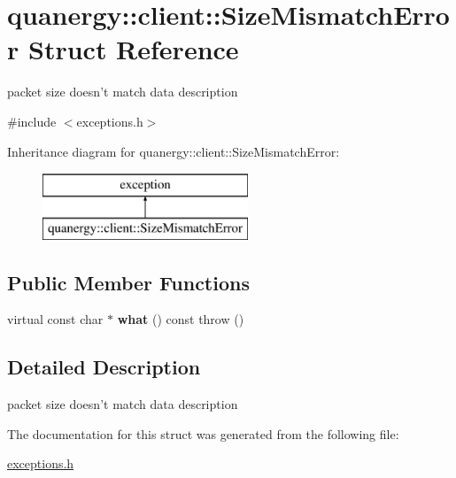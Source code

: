 \hypertarget{structquanergy_1_1client_1_1SizeMismatchError}{\section{quanergy\-:\-:client\-:\-:Size\-Mismatch\-Error Struct Reference}
\label{structquanergy_1_1client_1_1SizeMismatchError}
}


packet size doesn't match data description  




{\ttfamily \#include $<$exceptions.\-h$>$}

Inheritance diagram for quanergy\-:\-:client\-:\-:Size\-Mismatch\-Error\-:\begin{figure}[H]
\begin{center}
\leavevmode
\includegraphics[height=2.000000cm]{structquanergy_1_1client_1_1SizeMismatchError}
\end{center}
\end{figure}
\subsection*{Public Member Functions}
\begin{DoxyCompactItemize}
\item 
\hypertarget{structquanergy_1_1client_1_1SizeMismatchError_a421f9bb14d8a01e1e656a19558ac200d}{virtual const char $\ast$ {\bfseries what} () const   throw ()}\label{structquanergy_1_1client_1_1SizeMismatchError_a421f9bb14d8a01e1e656a19558ac200d}

\end{DoxyCompactItemize}


\subsection{Detailed Description}
packet size doesn't match data description 

The documentation for this struct was generated from the following file\-:\begin{DoxyCompactItemize}
\item 
\hyperlink{exceptions_8h}{exceptions.\-h}\end{DoxyCompactItemize}

